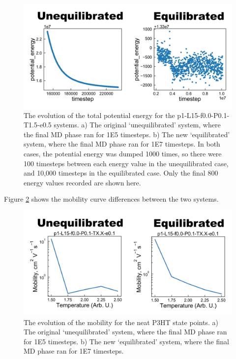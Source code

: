 \documentclass[12pt]{article}
\begin{document}
\begin{figure}[h!]\centering
	\includegraphics[width=\textwidth]{Figures/PE.pdf}
    \caption{The evolution of the total potential energy for the p1-L15-f0.0-P0.1-T1.5-e0.5 systems.
    a) The original `unequilibrated' system, where the final MD phase ran for 1E5 timesteps.
    b) The new `equilibrated' system, where the final MD phase ran for 1E7 timesteps.
    In both cases, the potential energy was dumped 1000 times, so there were 100 timesteps between each energy value in the unequilibrated case, and 10,000 timesteps in the equilibrated case.
    Only the final 800 energy values recorded are shown here.}
	\label{fig:Energy}
\end{figure}


Figure \ref{fig:Mobility} shows the mobility curve differences between the two systems.


\begin{figure}[h!]\centering
	\includegraphics[width=\textwidth]{Figures/Mob.pdf}
    \caption{The evolution of the mobility for the neat P3HT state points.
    a) The original `unequilibrated' system, where the final MD phase ran for 1E5 timesteps.
    b) The new `equilibrated' system, where the final MD phase ran for 1E7 timesteps.
}
	\label{fig:Mobility}
\end{figure}
\end{document}
